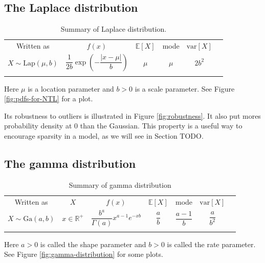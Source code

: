 \documentclass[graybox, envcountchap, twocolumn]{styles/svmult}
\begin{document}
\subsection{The Laplace distribution}
\begin{table}
\caption{Summary of Laplace distribution.}
\centering
\begin{tabular}{cccccc}
\hline\noalign{\smallskip}
Written as & $f(x)$ & $\mathbb{E}[X]$ & mode & $\text{var}[X]$ \\
\noalign{\smallskip}\svhline\noalign{\smallskip}
$X \sim \text{Lap}(\mu,b)$ & $\dfrac{1}{2b}\exp\left(-\dfrac{|x-\mu|}{b}\right)$ & $\mu$ & $\mu$ & $2b^2$ \\
\noalign{\smallskip}\hline
\end{tabular}
\end{table}

Here $\mu$ is a location parameter and $b>0$ is a scale parameter. See Figure \ref{fig:pdfs-for-NTL} for a plot.

Its robustness to outliers is illustrated in Figure \ref{fig:robustness}. It also put mores probability density at 0 than the Gaussian. This property is a useful way to encourage sparsity in a model, as we will see in Section TODO.


\subsection{The gamma distribution}

\begin{table}
\caption{Summary of gamma distribution}
\centering
\begin{tabular}{ccccccc}
\hline\noalign{\smallskip}
Written as & $X$ & $f(x)$ & $\mathbb{E}[X]$ & mode & $\text{var}[X]$ \\
\noalign{\smallskip}\svhline\noalign{\smallskip}
$X \sim \text{Ga}(a,b)$ & $x \in \mathbb{R}^+$ & $\dfrac{b^a}{\Gamma(a)}x^{a-1}e^{-xb}$ & $\dfrac{a}{b}$ & $\dfrac{a-1}{b}$ & $\dfrac{a}{b^2}$ \\
\noalign{\smallskip}\hline
\end{tabular}
\end{table} 

Here $a>0$ is called the shape parameter and $b>0$ is called the rate parameter. See Figure \ref{fig:gamma-distribution} for some plots.
\end{document}
